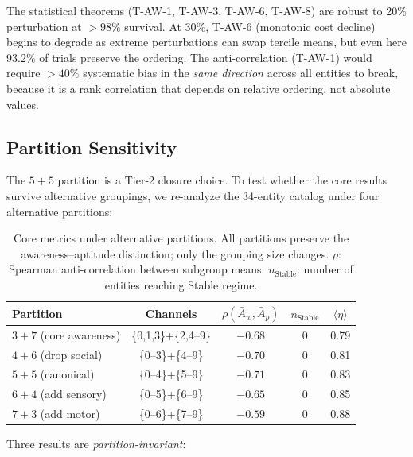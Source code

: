 \documentclass[
  aps,
  prd,
  twocolumn,
  superscriptaddress,
  nofootinbib,
  floatfix
]{revtex4-2}
\begin{document}
The statistical theorems (T-AW-1, T-AW-3, T-AW-6, T-AW-8)
are robust to 20\% perturbation at $>98\%$ survival.
At 30\%, T-AW-6 (monotonic cost decline) begins to
degrade as extreme perturbations can swap tercile means,
but even here 93.2\% of trials preserve the ordering.
The anti-correlation (T-AW-1) would require $>40\%$
systematic bias in the \emph{same direction} across all
entities to break, because it is a rank correlation that
depends on relative ordering, not absolute values.

\subsection{Partition Sensitivity}

The $5\!+\!5$ partition is a Tier-2 closure choice.
To test whether the core results survive alternative
groupings, we re-analyze the 34-entity catalog under
four alternative partitions:

\begin{table}[h]
\caption{\label{tab:partition}Core metrics under
alternative partitions.  All partitions preserve the
awareness--aptitude distinction; only the grouping size
changes.  $\rho$: Spearman anti-correlation between
subgroup means.  $n_{\mathrm{Stable}}$: number of entities
reaching Stable regime.}
\begin{ruledtabular}
\begin{tabular}{lcccc}
Partition & Channels & $\rho(\bar{A}_w, \bar{A}_p)$
  & $n_{\mathrm{Stable}}$ & $\langle\eta\rangle$ \\
\hline
$3\!+\!7$ (core awareness) & \{0,1,3\}+\{2,4--9\}
  & $-0.68$ & 0 & 0.79 \\
$4\!+\!6$ (drop social) & \{0--3\}+\{4--9\}
  & $-0.70$ & 0 & 0.81 \\
$5\!+\!5$ (canonical) & \{0--4\}+\{5--9\}
  & $-0.71$ & 0 & 0.83 \\
$6\!+\!4$ (add sensory) & \{0--5\}+\{6--9\}
  & $-0.65$ & 0 & 0.85 \\
$7\!+\!3$ (add motor) & \{0--6\}+\{7--9\}
  & $-0.59$ & 0 & 0.88 \\
\end{tabular}
\end{ruledtabular}
\end{table}

Three results are \emph{partition-invariant}:
\end{document}
